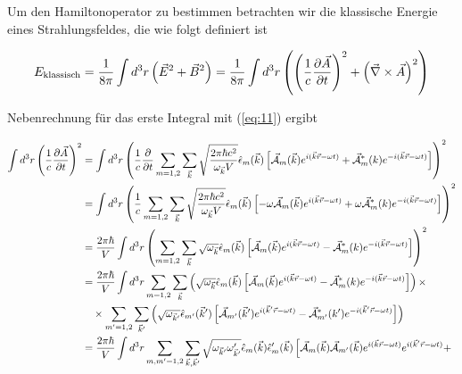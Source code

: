 Um den Hamiltonoperator zu bestimmen betrachten wir die klassische Energie eines Strahlungsfeldes, die wie folgt definiert ist

\begin{align}
  \label{eq:12}
  E_{\text{klassisch}} = \frac{1}{8\pi} \int d^3r \left( \vec E^2+\vec B^2 \right) = \frac{1}{8\pi} \int d^3r \left( \left( \frac{1}{c} \pdiff{\vec A}_t \right)^2 + \left(\vec \nabla\times\vec A\right)^2 \right)
\end{align}

Nebenrechnung für das erste Integral mit (\ref{eq:11}) ergibt

\begin{align}
  \label{eq:13}
 \int d^3r  \left( \frac{1}{c} \pdiff{\vec A}_t \right)^2 &= \int d^3r  \left( \frac{1}{c} \pdiff_t    \sum_{m=1,2} \sum_{\vec k} \sqrt{\frac{2\pi\hbar c^2}{\omega_{\vec k}V}}  \hat \epsilon_m(\vec k)  \left[  \vec{\mathcal A}_m (\vec k)  e^{i(\vec k\vec r-\omega t)} + \vec{\mathcal A}^*_m (k) e^{-i(\vec k\vec r-\omega t)}\right] \right)^2 \notag\\
&= \int d^3r  \left( \frac{1}{c}  \sum_{m=1,2} \sum_{\vec k} \sqrt{\frac{2\pi\hbar c^2}{\omega_{\vec k}V}}  \hat \epsilon_m(\vec k)  \left[ -\omega \vec{\mathcal A}_m (\vec k)  e^{i(\vec k\vec r-\omega t)} + \omega \vec{\mathcal A}^*_m (k) e^{-i(\vec k\vec r-\omega t)}\right] \right)^2 \notag\\
&=  \frac{2\pi\hbar}{V} \int d^3r  \left( \sum_{m=1,2} \sum_{\vec k} \sqrt{\omega_{\vec k}} \hat \epsilon_m(\vec k)  \left[\vec{\mathcal A}_m (\vec k)  e^{i(\vec k\vec r-\omega t)} - \vec{\mathcal A}^*_m (k) e^{-i(\vec k\vec r-\omega t)}\right] \right)^2 \notag\\
&=  \frac{2\pi\hbar}{V} \int d^3r  \sum_{m=1,2} \sum_{\vec k}  \left( \sqrt{\omega_{\vec k}} \hat \epsilon_m(\vec k)  \left[\vec{\mathcal A}_m (\vec k)  e^{i(\vec k\vec r-\omega t)} - \vec{\mathcal A}^*_m (k) e^{-i(\vec k\vec r-\omega t)}\right] \right) \times   \notag\\
  &\quad \times \sum_{m'=1,2} \sum_{\vec k'} \left( \sqrt{\omega_{\vec k'}} \hat \epsilon_{m'}(\vec k')  \left[\vec{\mathcal A}_{m'} (\vec k')  e^{i(\vec k'\vec r-\omega t)} - \vec{\mathcal A}^*_{m'} (k') e^{-i(\vec k'\vec r-\omega t)}\right] \right) \notag \\
%
&= \frac{2\pi\hbar}{V} \int d^3r  \sum_{m,m'=1,2} \sum_{\vec k,\vec k'}   \sqrt{\omega_{\vec k'}\omega'_{\vec k'}} \hat \epsilon_m(\vec k) \hat \epsilon'_m(\vec k)  \left[ \vec{\mathcal A}_m (\vec k) \vec{\mathcal A}_{m'} (\vec k)e^{i(\vec k\vec r-\omega t)}e^{i(\vec k'\vec r-\omega t)} + \right. \notag\\

\end{align}
